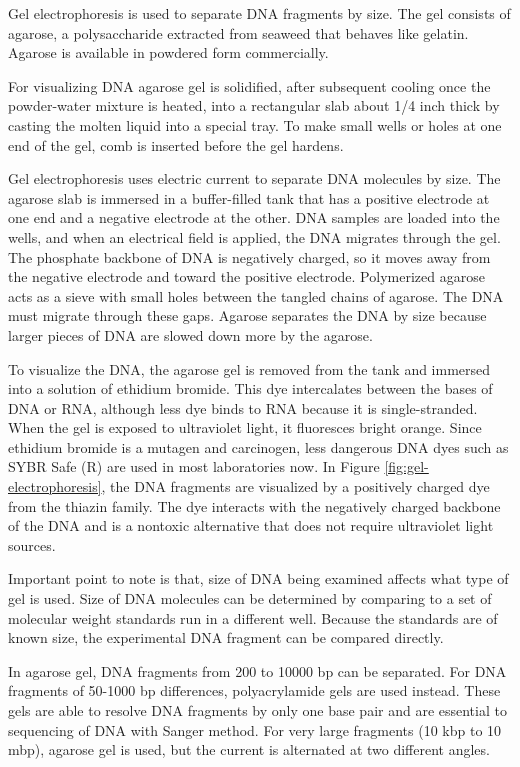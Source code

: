 \documentclass[nofonts,]{tufte-handout}
\begin{document}
Gel electrophoresis is used to separate DNA fragments by size. The gel
consists of agarose, a polysaccharide extracted from seaweed that
behaves like gelatin. Agarose is available in powdered form
commercially.

For visualizing DNA agarose gel is solidified, after subsequent cooling
once the powder-water mixture is heated, into a rectangular slab about
1/4 inch thick by casting the molten liquid into a special tray. To make
small wells or holes at one end of the gel, comb is inserted before the
gel hardens.

Gel electrophoresis uses electric current to separate DNA molecules by
size. The agarose slab is immersed in a buffer-filled tank that has a
positive electrode at one end and a negative electrode at the other. DNA
samples are loaded into the wells, and when an electrical field is
applied, the DNA migrates through the gel. The phosphate backbone of DNA
is negatively charged, so it moves away from the negative electrode and
toward the positive electrode. Polymerized agarose acts as a sieve with
small holes between the tangled chains of agarose. The DNA must migrate
through these gaps. Agarose separates the DNA by size because larger
pieces of DNA are slowed down more by the agarose.

To visualize the DNA, the agarose gel is removed from the tank and
immersed into a solution of ethidium bromide. This dye intercalates
between the bases of DNA or RNA, although less dye binds to RNA because
it is single-stranded. When the gel is exposed to ultraviolet light, it
fluoresces bright orange. Since ethidium bromide is a mutagen and
carcinogen, less dangerous DNA dyes such as SYBR Safe (R) are used in
most laboratories now. In Figure \ref{fig:gel-electrophoresis}, the DNA
fragments are visualized by a positively charged dye from the thiazin
family. The dye interacts with the negatively charged backbone of the
DNA and is a nontoxic alternative that does not require ultraviolet
light sources.

Important point to note is that, size of DNA being examined affects what
type of gel is used. Size of DNA molecules can be determined by
comparing to a set of molecular weight standards run in a different
well. Because the standards are of known size, the experimental DNA
fragment can be compared directly.

In agarose gel, DNA fragments from 200 to 10000 bp can be separated. For
DNA fragments of 50-1000 bp differences, polyacrylamide gels are used
instead. These gels are able to resolve DNA fragments by only one base
pair and are essential to sequencing of DNA with Sanger method. For very
large fragments (10 kbp to 10 mbp), agarose gel is used, but the current
is alternated at two different angles.
\end{document}
